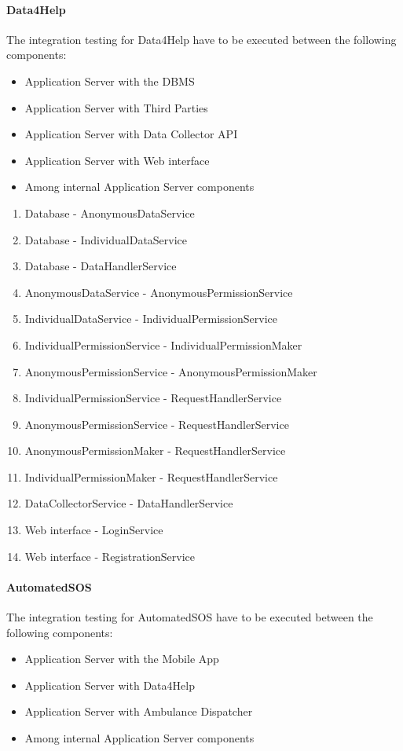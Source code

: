 \documentclass[a4paper]{article}
\begin{document}
\paragraph{Data4Help}
The integration testing for Data4Help have to be executed between the following components:

\begin{itemize}
    \item Application Server with the DBMS
    \item Application Server with Third Parties
    \item Application Server with Data Collector API
    \item Application Server with Web interface
    \item Among internal Application Server components
\end{itemize}

\begin{enumerate}
    \item Database - AnonymousDataService
    \item Database - IndividualDataService
    \item Database - DataHandlerService
    \item AnonymousDataService - AnonymousPermissionService
    \item IndividualDataService - IndividualPermissionService
    \item IndividualPermissionService - IndividualPermissionMaker
    \item AnonymousPermissionService - AnonymousPermissionMaker
    \item IndividualPermissionService - RequestHandlerService
    \item AnonymousPermissionService - RequestHandlerService
    \item AnonymousPermissionMaker - RequestHandlerService
    \item IndividualPermissionMaker - RequestHandlerService
    \item DataCollectorService - DataHandlerService
    \item Web interface - LoginService
    \item Web interface - RegistrationService
\end{enumerate}

\paragraph{AutomatedSOS}
The integration testing for AutomatedSOS have to be executed between the following components:
\begin{itemize}
    \item Application Server with the Mobile App
    \item Application Server with Data4Help
    \item Application Server with Ambulance Dispatcher
    \item Among internal Application Server components
\end{itemize}
\end{document}
